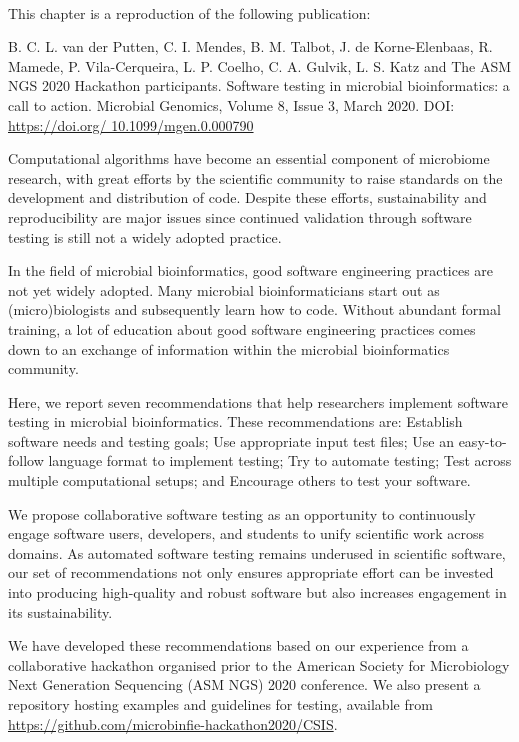 \mbox{}\\
\vspace{8cm}

This chapter is a reproduction of the following publication:

B. C. L. van der Putten, C. I. Mendes, B. M. Talbot, J. de Korne-Elenbaas, R. Mamede, P. Vila-Cerqueira, L. P. Coelho, C. A. Gulvik, L. S. Katz and The ASM NGS 2020 Hackathon participants. Software testing in microbial bioinformatics: a call to action. Microbial Genomics, Volume 8, Issue 3, March 2020. DOI: \url{https://doi.org/ 10.1099/mgen.0.000790}

Computational algorithms have become an essential component of microbiome research, with great efforts by the scientific community to raise standards on the development and distribution of code. Despite these efforts, sustainability and reproducibility are major issues since continued validation through software testing is still not a widely adopted practice.  

In the field of microbial bioinformatics, good software engineering practices are not yet widely adopted. Many microbial bioinformaticians start out as (micro)biologists and subsequently learn how to code. Without abundant formal training, a lot of education about good software engineering practices comes down to an exchange of information within the microbial bioinformatics community. 

Here, we report seven recommendations that help researchers implement software testing in microbial bioinformatics. These recommendations are: Establish software needs and testing goals; Use appropriate input test files; Use an easy-to-follow language format to implement testing; Try to automate testing; Test across multiple computational setups; and Encourage others to test your software.

We propose collaborative software testing as an opportunity to continuously engage software users, developers, and students to unify scientific work across domains. As automated software testing remains underused in scientific software, our set of recommendations not only ensures appropriate effort can be invested into producing high-quality and robust software but also increases engagement in its sustainability.

We have developed these recommendations based on our experience from a collaborative hackathon organised prior to the American Society for Microbiology Next Generation Sequencing (ASM NGS) 2020 conference. We also present a repository hosting examples and guidelines for testing, available from \url{https://github.com/microbinfie-hackathon2020/CSIS}.

